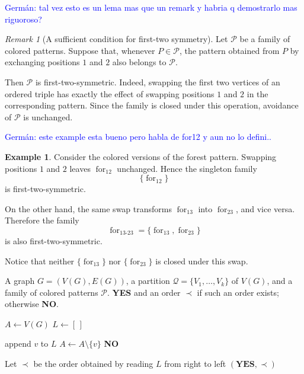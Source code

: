 \documentclass[12pt]{article}
\theoremstyle{plain}
\theoremstyle{definition}
\newtheorem{example}[theorem]{Example}
\theoremstyle{remark}
\newtheorem{remark}[theorem]{Remark}
\theoremstyle{definition}
\newcommand{\forlabel}{\mathrm{for}}
\DeclareRobustCommand{\forparam}[1]{%
  \ensuremath{\mathop{\forlabel}\nolimits_{#1}}%
}
\newcommand{\german}[1]{%
  \textcolor{blue}{Germán: #1}%
}
\begin{document}
\german{tal vez esto es un lema mas que un remark y habria q demostrarlo mas riguoroso?}
\begin{remark}[A sufficient condition for first-two symmetry]
\label{rem:swap-first-two}
Let \(\mathcal P\) be a family of colored patterns. Suppose that, whenever
\(P\in\mathcal P\), the pattern obtained from \(P\) by exchanging positions
\(1\) and \(2\) also belongs to \(\mathcal P\).

Then \(\mathcal P\) is first-two-symmetric. Indeed, swapping the first two
vertices of an ordered triple has exactly the effect of swapping positions
\(1\) and \(2\) in the corresponding pattern. Since the family is closed
under this operation, avoidance of \(\mathcal P\) is unchanged.
\end{remark}

\german{este example esta bueno pero habla de for12 y aun no lo defini..}
\begin{example}
Consider the colored versions of the forest pattern. Swapping positions
\(1\) and \(2\) leaves \(\forparam{12}\) unchanged. Hence the singleton
family
\[
\{\forparam{12}\}
\]
is first-two-symmetric.

On the other hand, the same swap transforms \(\forparam{13}\) into
\(\forparam{23}\), and vice versa. Therefore the family
\[
\forparam{13\text{-}23}
=
\{\forparam{13},\forparam{23}\}
\]
is also first-two-symmetric.

Notice that neither \(\{\forparam{13}\}\) nor
\(\{\forparam{23}\}\) is closed under this swap.
\end{example}




\begin{algorithm}[h]
\caption{\textsc{Given-Partition-\(\mathcal P\)}}
\label{alg:generic-given-partition}
\begin{algorithmic}[1]
\Require A graph \(G=(V(G),E(G))\), a partition \(\mathcal Q=\{V_1,\dots,V_k\}\) of \(V(G)\), and a family of colored patterns \(\mathcal P\).
\Ensure \textbf{YES} and an order \(\prec\) if such an order exists; otherwise \textbf{NO}.

\State \(A \gets V(G)\)
\State \(L \gets [\,]\) 

        \State append \(v\) to \(L\)
        \State \(A\gets A\setminus\{v\}\)
    \Else
        \State \Return \textbf{NO}
    \EndIf
\EndWhile

\State Let \(\prec\) be the order obtained by reading \(L\) from right to left
\State \Return \((\textbf{YES},\prec)\)
\end{algorithmic}
\end{algorithm}
\end{document}
